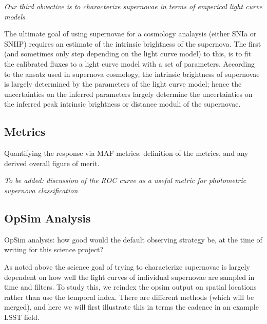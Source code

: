 {\emph{Our third obvective is to characterize supernovae in terms of emperical
    light curve models}}

The ultimate goal of using supernovae for a cosmology analaysis (either SNIa or SNIIP) requires an estimate of the intrinsic brightness of the supernova. The
first (and sometimes only step depending on the light curve model) to this, is
to fit the calibrated fluxes to a light curve model with a set of parameters.
According to the ansatz used in supernova cosmology, the intrinsic brightness of
 supernovae is largely determined by the parameters of the light curve model; 
 hence the uncertainties on the inferred parameters largely determine the
 uncertainties on the inferred peak intrinsic brightness or distance moduli of the supernovae.








\subsection{Metrics}
\label{sec:keyword:metrics}

Quantifying the response via MAF metrics: definition of the metrics,
and any derived overall figure of merit.

\emph{To be added: discussion of the ROC curve as a useful metric for photometric supernova 
classification}


\subsection{OpSim Analysis}
\label{sec:keyword:analysis}

OpSim analysis: how good would the default observing strategy be, at
the time of writing for this science project?

As noted above the science goal of trying to characterize supernovae is largely
dependent on how well the light curves of individual supernovae are sampled in
time and filters. To study this, we reindex the opsim output on spatial
locations rather than use the temporal index. There are different methods (which will be merged), and here we will first illustrate this in terms the cadence in an example LSST field.

